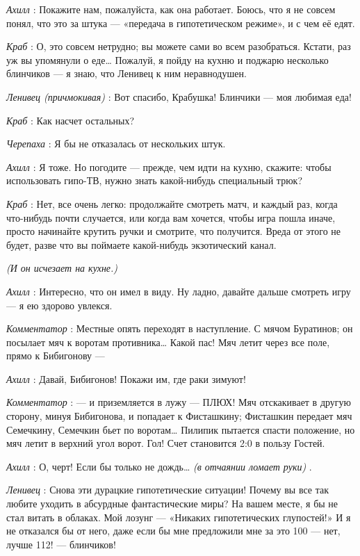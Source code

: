 \documentclass[../main.tex]{subfiles}
\begin{document}
\begin{dialogue}
\emph{Ахилл} : Покажите нам, пожалуйста, как она работает. Боюсь, что я не совсем понял, что это за штука --- «передача в гипотетическом режиме», и с чем её едят.

\emph{Краб} : О, это совсем нетрудно; вы можете сами во всем разобраться. Кстати, раз уж вы упомянули о еде\ldots{} Пожалуй, я пойду на кухню и поджарю несколько блинчиков --- я знаю, что Ленивец к ним неравнодушен.

\emph{Ленивец (причмокивая)} : Вот спасибо, Крабушка! Блинчики --- моя любимая еда!

\emph{Краб} : Как насчет остальных?

\emph{Черепаха} : Я бы не отказалась от нескольких штук.

\emph{Ахилл} : Я тоже. Но погодите --- прежде, чем идти на кухню, скажите: чтобы использовать гипо-ТВ, нужно знать какой-нибудь специальный трюк?

\emph{Краб} : Нет, все очень легко: продолжайте смотреть матч, и каждый раз, когда что-нибудь почти случается, или когда вам хочется, чтобы игра пошла иначе, просто начинайте крутить ручки и смотрите, что получится. Вреда от этого не будет, разве что вы поймаете какой-нибудь экзотический канал.

\emph{(И он исчезает на кухне.)}

\emph{Ахилл} : Интересно, что он имел в виду. Ну ладно, давайте дальше смотреть игру --- я ею здорово увлекся.

\emph{Комментатор} : Местные опять переходят в наступление. С мячом Буратинов; он посылает мяч к воротам противника\ldots{} Какой пас! Мяч летит через все поле, прямо к Бибигонову ---

\emph{Ахилл} : Давай, Бибигонов! Покажи им, где раки зимуют!

\emph{Комментатор} : --- и приземляется в лужу --- ПЛЮХ! Мяч отскакивает в другую сторону, минуя Бибигонова, и попадает к Фисташкину; Фисташкин передает мяч Семечкину, Семечкин бьет по воротам\ldots{} Пилипик пытается спасти положение, но мяч летит в верхний угол ворот. Гол! Счет становится 2:0 в пользу Гостей.

\emph{Ахилл} : О, черт! Если бы только не дождь\ldots{} \emph{(в отчаянии ломает руки)} .

\emph{Ленивец} : Снова эти дурацкие гипотетические ситуации! Почему вы все так любите уходить в абсурдные фантастические миры? На вашем месте, я бы не стал витать в облаках. Мой лозунг --- «Никаких гипотетических глупостей!» И я не отказался бы от него, даже если бы мне предложили мне за это 100 --- нет, лучше 112! --- блинчиков!


\end{dialogue}
\end{document}
